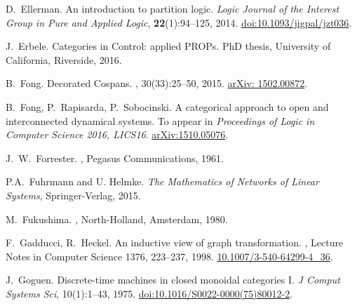 \begin{thebibliography}{RSW00}
  D.\ Ellerman.
  \newblock An introduction to partition logic.
  \newblock \textsl{Logic Journal of the Interest Group in Pure and Applied
  Logic}, {\bf 22}(1):94--125, 2014.
  \newblock
  \href{http://doi.org/10.1093/jigpal/jzt036}{doi:10.1093/jigpal/jzt036}.
    
    J.\ Erbele.
    \newblock Categories in Control: applied PROPs.
    \newblock PhD thesis, University of California, Riverside, 2016. 

    B.\ Fong.
    \newblock Decorated Cospans.
    , 30(33):25--50, 2015.
    \newblock \href{http://arxiv.org/abs/1502.00872}{arXiv: 1502.00872}.

    B.\ Fong, P.\ Rapisarda, P.\ Sobocinski.
    \newblock A categorical approach to open and interconnected dynamical
    systems.
    \newblock To appear in {\sl Proceedings of Logic in Computer Science 2016,
    LICS16}.
    \newblock \href{http://arxiv.org/abs/1510.05076}{arXiv:1510.05076}.

    J.\ W.\ Forrester.
    , Pegasus Communications, 1961. 


    P.A.~Fuhrmann and U. Helmke.
    \newblock \emph{The Mathematics of Networks of Linear Systems},
    Springer-Verlag, 2015. 

    M.\ Fukushima.
    ,
    North-Holland, Amsterdam, 1980.

    F.\ Gadducci, R.\ Heckel.
    \newblock An inductive view of graph transformation.
    , Lecture
    Notes in Computer Science 1376, 223--237, 1998.
    \newblock \href{http://doi.org/10.1007/3-540-64299-4_36}{
    10.1007/3-540-64299-4\_36}.

    J.\ Goguen.
    \newblock Discrete-time machines in closed monoidal categories I.
    \newblock \emph{J Comput Systems Sci}, 10(1):1--43, 1975.
    \newblock
    \href{http://doi.org/10.1016/S0022-0000(75)80012-2}{doi:10.1016/S0022-0000(75)80012-2}.


\end{thebibliography}
